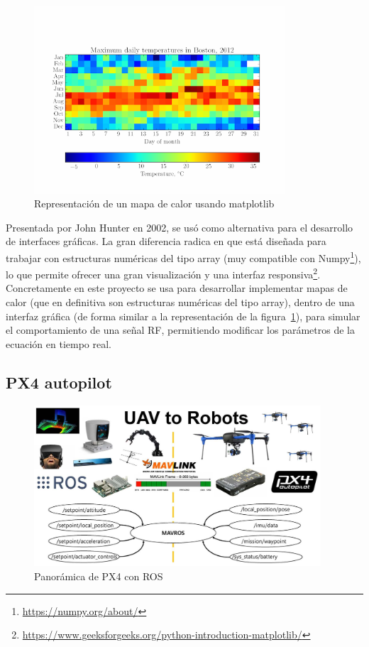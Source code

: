 \begin{figure} [t]
	\begin{center}
	\includegraphics[height=7cm]{imagenes/cap3/6_matplotlib_app.png}
	\end{center}
	\caption[Representación de un mapa de calor usando matplotlib]{Representación de un mapa de calor usando matplotlib}
	\label{fig:matplotlib}
\end{figure}

Presentada por John Hunter en 2002, se usó como alternativa para el desarrollo de interfaces gráficas. La gran diferencia radica en que está diseñada para trabajar con estructuras numéricas del tipo array (muy compatible con Numpy\footnote[12]{\url{https://numpy.org/about/}}), lo que permite ofrecer una gran visualización y una interfaz responsiva\footnote[13]{\url{https://www.geeksforgeeks.org/python-introduction-matplotlib/}}.\\

Concretamente en este proyecto se usa para desarrollar implementar mapas de calor (que en definitiva son estructuras numéricas del tipo array), dentro de una interfaz gráfica (de forma similar a la representación de la figura~\ref{fig:matplotlib}), para simular el comportamiento de una señal \ac{RF}, permitiendo modificar los parámetros de la ecuación en tiempo real.

\subsection{PX4 autopilot}
\label{subsec:px4}

\begin{figure} [tp]
	\begin{center}
	\includegraphics[height=6cm]{imagenes/cap3/7_px4_logo.jpeg}
	\end{center}
	\caption[Panorámica de PX4 con \ac{ROS}]{Panorámica de PX4 con \ac{ROS}}
	\label{fig:px4autopilot}
\end{figure}

